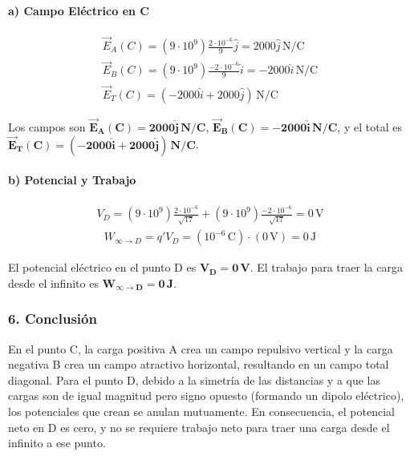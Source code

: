 \paragraph*{a) Campo Eléctrico en C}
\begin{gather}
    \vec{E}_A(C) = (9\cdot10^9) \frac{2\cdot10^{-6}}{9} \hat{j} = 2000 \hat{j} \, \text{N/C} \\
    \vec{E}_B(C) = (9\cdot10^9) \frac{-2\cdot10^{-6}}{9} \hat{i} = -2000 \hat{i} \, \text{N/C} \\
    \vec{E}_T(C) = (-2000 \hat{i} + 2000 \hat{j}) \, \text{N/C}
\end{gather}
\begin{cajaresultado}
    Los campos son $\boldsymbol{\vec{E}_A(C) = 2000 \hat{j} \, N/C}$, $\boldsymbol{\vec{E}_B(C) = -2000 \hat{i} \, N/C}$, y el total es $\boldsymbol{\vec{E}_T(C) = (-2000 \hat{i} + 2000 \hat{j}) \, N/C}$.
\end{cajaresultado}

\paragraph*{b) Potencial y Trabajo}
\begin{gather}
    V_D = (9\cdot10^9) \frac{2\cdot10^{-6}}{\sqrt{17}} + (9\cdot10^9) \frac{-2\cdot10^{-6}}{\sqrt{17}} = 0 \, \text{V}
\end{gather}
\begin{gather}
    W_{\infty \to D} = q' V_D = (10^{-6} \, \text{C}) \cdot (0 \, \text{V}) = 0 \, \text{J}
\end{gather}
\begin{cajaresultado}
    El potencial eléctrico en el punto D es $\boldsymbol{V_D = 0 \, V}$. El trabajo para traer la carga desde el infinito es $\boldsymbol{W_{\infty \to D} = 0 \, J}$.
\end{cajaresultado}

\subsubsection*{6. Conclusión}
\begin{cajaconclusion}
En el punto C, la carga positiva A crea un campo repulsivo vertical y la carga negativa B crea un campo atractivo horizontal, resultando en un campo total diagonal. Para el punto D, debido a la simetría de las distancias y a que las cargas son de igual magnitud pero signo opuesto (formando un dipolo eléctrico), los potenciales que crean se anulan mutuamente. En consecuencia, el potencial neto en D es cero, y no se requiere trabajo neto para traer una carga desde el infinito a ese punto.
\end{cajaconclusion}

